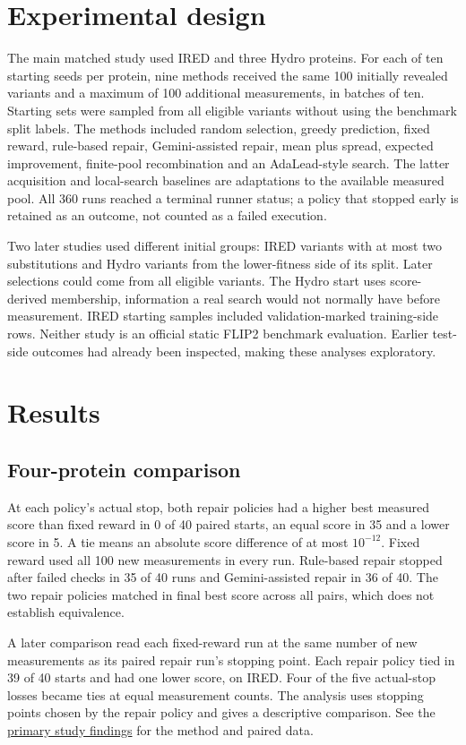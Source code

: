 \documentclass[11pt,a4paper]{article}
\begin{document}
\section{Experimental design}
The main matched study used IRED and three Hydro proteins. For each of ten starting seeds per protein, nine methods received the same 100 initially revealed variants and a maximum of 100 additional measurements, in batches of ten. Starting sets were sampled from all eligible variants without using the benchmark split labels. The methods included random selection, greedy prediction, fixed reward, rule-based repair, Gemini-assisted repair, mean plus spread, expected improvement, finite-pool recombination and an AdaLead-style search. The latter acquisition and local-search baselines are adaptations to the available measured pool. All 360 runs reached a terminal runner status; a policy that stopped early is retained as an outcome, not counted as a failed execution.

Two later studies used different initial groups: IRED variants with at most two substitutions and Hydro variants from the lower-fitness side of its split. Later selections could come from all eligible variants. The Hydro start uses score-derived membership, information a real search would not normally have before measurement. IRED starting samples included validation-marked training-side rows. Neither study is an official static FLIP2 benchmark evaluation. Earlier test-side outcomes had already been inspected, making these analyses exploratory.

\section{Results}
\subsection{Four-protein comparison}
At each policy's actual stop, both repair policies had a higher best measured score than fixed reward in 0 of 40 paired starts, an equal score in 35 and a lower score in 5. A tie means an absolute score difference of at most $10^{-12}$. Fixed reward used all 100 new measurements in every run. Rule-based repair stopped after failed checks in 35 of 40 runs and Gemini-assisted repair in 36 of 40. The two repair policies matched in final best score across all pairs, which does not establish equivalence.

A later comparison read each fixed-reward run at the same number of new measurements as its paired repair run's stopping point. Each repair policy tied in 39 of 40 starts and had one lower score, on IRED. Four of the five actual-stop losses became ties at equal measurement counts. The analysis uses stopping points chosen by the repair policy and gives a descriptive comparison. See the \href{../../research/multiprotein_study_findings.md}{primary study findings} for the method and paired data.
\end{document}
